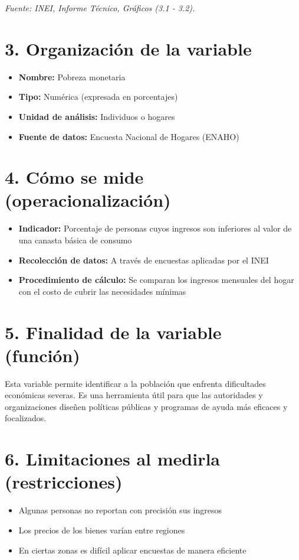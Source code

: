 \documentclass[12pt]{article}
\begin{document}
\textit{Fuente: INEI, Informe Técnico, Gráficos (3.1 - 3.2).}

\section*{3. Organizaci\'on de la variable}
\begin{itemize}
  \item \textbf{Nombre:} Pobreza monetaria
  \item \textbf{Tipo:} Numérica (expresada en porcentajes)
  \item \textbf{Unidad de análisis:} Individuos o hogares
  \item \textbf{Fuente de datos:} Encuesta Nacional de Hogares (ENAHO)
\end{itemize}

\section*{4. C\'omo se mide (operacionalizaci\'on)}
\begin{itemize}
  \item \textbf{Indicador:} Porcentaje de personas cuyos ingresos son inferiores al valor de una canasta básica de consumo
  \item \textbf{Recolección de datos:} A través de encuestas aplicadas por el INEI
  \item \textbf{Procedimiento de cálculo:} Se comparan los ingresos mensuales del hogar con el costo de cubrir las necesidades mínimas
\end{itemize}

\section*{5. Finalidad de la variable (funci\'on)}
Esta variable permite identificar a la población que enfrenta dificultades económicas severas. Es una herramienta útil para que las autoridades y organizaciones diseñen políticas públicas y programas de ayuda más eficaces y focalizados.

\section*{6. Limitaciones al medirla (restricciones)}
\begin{itemize}
  \item Algunas personas no reportan con precisión sus ingresos
  \item Los precios de los bienes varían entre regiones
  \item En ciertas zonas es difícil aplicar encuestas de manera eficiente
\end{itemize}
\end{document}
